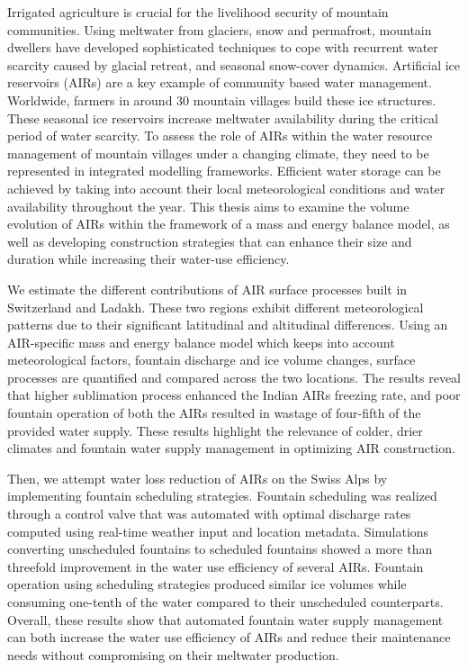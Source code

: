 %
\label{sec:summary}

Irrigated agriculture is crucial for the livelihood security of mountain communities. Using meltwater from
glaciers, snow and permafrost, mountain dwellers have developed sophisticated techniques to cope with recurrent
water scarcity caused by glacial retreat, and seasonal snow-cover dynamics. Artificial ice
reservoirs (AIRs) are a key example of community based water management. Worldwide, farmers in around 30 mountain
villages build these ice structures. These seasonal ice reservoirs increase meltwater availability during the
critical period of water scarcity. To assess the role of AIRs within the water resource management of
mountain villages under a changing climate, they need to be represented in integrated modelling frameworks.
Efficient water storage can be achieved by taking into account their local meteorological conditions and
water availability throughout the year. This thesis aims to examine the volume evolution of AIRs within the
framework of a mass and energy balance model, as well as developing construction strategies that can enhance
their size and duration while increasing their water-use efficiency.

We estimate the different contributions of AIR surface processes built in Switzerland and
Ladakh. These two regions exhibit different meteorological patterns due to their significant latitudinal
and altitudinal differences. Using an AIR-specific mass and energy balance model which keeps into account
meteorological factors, fountain discharge and ice volume changes, surface processes are quantified and compared
across the two locations. The results reveal that higher sublimation process enhanced the Indian AIRs freezing
rate, and poor fountain operation of both the AIRs resulted in wastage of four-fifth of the provided water supply.
These results highlight the relevance of colder, drier climates and fountain water supply
management in optimizing AIR construction.

Then, we attempt water loss reduction of AIRs on the Swiss Alps by implementing
fountain scheduling strategies. Fountain scheduling was realized through a control valve that was automated with
optimal discharge rates computed using real-time weather input and location metadata. Simulations converting
unscheduled fountains to scheduled fountains showed a more than threefold improvement in the water use
efficiency of several AIRs. Fountain operation using scheduling strategies produced similar ice volumes while
consuming one-tenth of the water compared to their unscheduled counterparts.  Overall, these results show that
automated fountain water supply management can both increase the water use efficiency of AIRs and reduce their
maintenance needs without compromising on their meltwater production.

